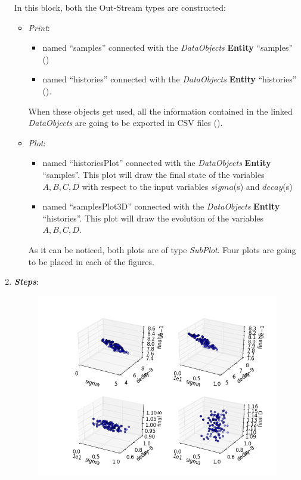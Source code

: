 \begin{enumerate}
  In this block, both the Out-Stream types are constructed:
  \begin{itemize}
    \item \textit{Print}:
     \begin{itemize}
       \item named ``samples'' connected with the \textit{DataObjects} \textbf{Entity} ``samples''
                ()
       \item named ``histories'' connected with the \textit{DataObjects} \textbf{Entity} ``histories'' ().
     \end{itemize}
      When these objects get used, all the information contained in the
      linked  \textit{DataObjects} are going
    to be exported in CSV files ().
    \item \textit{Plot}:
    \begin{itemize}
      \item named ``historiesPlot'' connected with the  \textit{DataObjects}
      \textbf{Entity} ``samples''.  This plot will draw the final state of the
      variables $A,B,C,D$ with respect to the input variables $sigma$(s)
      and $decay$(s)
      \item named ``samplesPlot3D'' connected with the
      \textit{DataObjects} \textbf{Entity} ``histories''. This plot will draw the
      evolution of the variables $A,B,C,D$.
    \end{itemize}
     As it can be noticed, both plots are of type \textit{SubPlot}. Four plots
     are going to be placed in each of the figures.
  \end{itemize}
   \item \textbf{\textit{Steps}}:
 \begin{figure}[h!]
  \centering
  \includegraphics[scale=0.7]{../../tests/framework/user_guide/ForwardSamplingStrategies/gold/RunDir/Stratified/1-samplesPlot3D_scatter-scatter-scatter-scatter.png}

\end{figure}
\end{enumerate}

